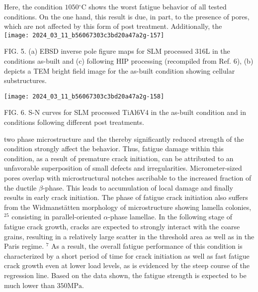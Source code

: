\documentclass[10pt]{article}
\begin{document}
Here, the condition $1050{ }^{\circ} \mathrm{C}$ shows the worst fatigue behavior of all tested conditions. On the one hand, this result is due, in part, to the presence of pores, which are not affected by this form of post treatment. Additionally, the\\
\texttt{[image: 2024\_03\_11\_b56067303c3bd20a47a2g-157]}

FIG. 5. (a) EBSD inverse pole figure maps for SLM processed 316L in the conditions as-built and (c) following HIP processing (recompiled from Ref. 6), (b) depicts a TEM bright field image for the as-built condition showing cellular substructures.

\begin{center}
\texttt{[image: 2024\_03\_11\_b56067303c3bd20a47a2g-158]}
\end{center}

FIG. 6. S-N curves for SLM processed TiAl6V4 in the as-built condition and in conditions following different post treatments.

two phase microstructure and the thereby significantly reduced strength of the condition strongly affect the behavior. Thus, fatigue damage within this condition, as a result of premature crack initiation, can be attributed to an unfavorable superposition of small defects and irregularities. Micrometer-sized pores overlap with microstructural notches ascribable to the increased fraction of the ductile $\beta$-phase. This leads to accumulation of local damage and finally results in early crack initiation. The phase of fatigue crack initiation also suffers from the Widmanstätten morphology of microstructure showing lamella colonies, ${ }^{25}$ consisting in parallel-oriented $\alpha$-phase lamellae. In the following stage of fatigue crack growth, cracks are expected to strongly interact with the coarse grains, resulting in a relatively large scatter in the threshold area as well as in the Paris regime. ${ }^{7}$ As a result, the overall fatigue performance of this condition is characterized by a short period of time for crack initiation as well as fast fatigue crack growth even at lower load levels, as is evidenced by the steep course of the regression line. Based on the data shown, the fatigue strength is expected to be much lower than $350 \mathrm{MPa}$.
\end{document}
